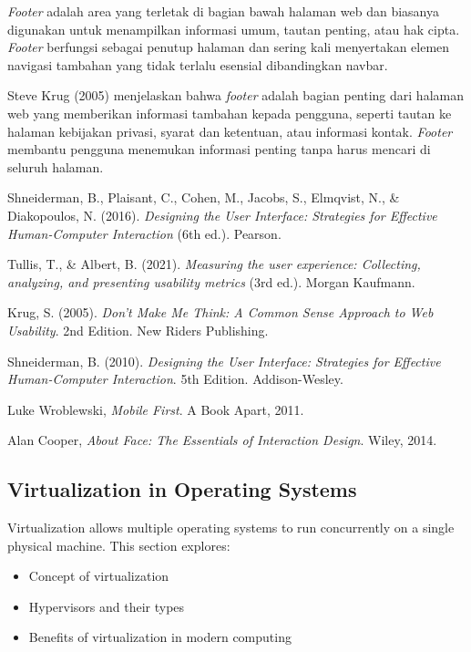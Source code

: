 \documentclass[12pt]{article}
\begin{document}
\begin{itemize}
\par \emph{Footer} adalah area yang terletak di bagian bawah halaman web dan biasanya digunakan untuk menampilkan informasi umum, tautan penting, atau hak cipta. \emph{Footer} berfungsi sebagai penutup halaman dan sering kali menyertakan elemen navigasi tambahan yang tidak terlalu esensial dibandingkan navbar.

\par Steve Krug (2005) menjelaskan bahwa \emph{footer} adalah bagian penting dari halaman web yang memberikan informasi tambahan kepada pengguna, seperti tautan ke halaman kebijakan privasi, syarat dan ketentuan, atau informasi kontak. \emph{Footer} membantu pengguna menemukan informasi penting tanpa harus mencari di seluruh halaman.

\end{itemize}

\begin{thebibliography}{9} 
Shneiderman, B., Plaisant, C., Cohen, M., Jacobs, S., Elmqvist, N., \& Diakopoulos, N. (2016). \textit{Designing the User Interface: Strategies for Effective Human-Computer Interaction} (6th ed.). Pearson.

Tullis, T., \& Albert, B. (2021). \textit{Measuring the user experience: Collecting, analyzing, and presenting usability metrics} (3rd ed.). Morgan Kaufmann.

Krug, S. (2005). \textit{Don't Make Me Think: A Common Sense Approach to Web Usability}. 2nd Edition. New Riders Publishing.

Shneiderman, B. (2010). \textit{Designing the User Interface: Strategies for Effective Human-Computer Interaction}. 5th Edition. Addison-Wesley.

Luke Wroblewski, \emph{Mobile First}. A Book Apart, 2011.

Alan Cooper, \emph{About Face: The Essentials of Interaction Design}. Wiley, 2014.


\end{thebibliography}

\subsection{Virtualization in Operating Systems}
Virtualization allows multiple operating systems to run concurrently on a single physical machine. This section explores:
\begin{itemize}
    \item Concept of virtualization
    \item Hypervisors and their types
    \item Benefits of virtualization in modern computing
\end{itemize}
\end{document}
